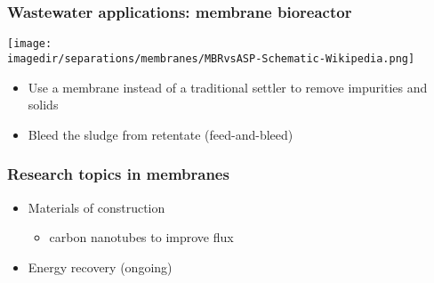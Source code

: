 \begin{frame}\frametitle{Wastewater applications: membrane bioreactor}
	

	
	\begin{center}
		\texttt{[image: \\imagedir/separations/membranes/MBRvsASP-Schematic-Wikipedia.png]}
	\end{center}
	
	\begin{itemize}
		\item	Use a membrane instead of a traditional settler to remove impurities and solids
		\item	Bleed the sludge from retentate (feed-and-bleed)
	\end{itemize}
\end{frame}

\begin{frame}\frametitle{Research topics in membranes}
	\begin{itemize}
		\item	Materials of construction
		\begin{itemize}
			\item	carbon nanotubes to improve flux %
		\end{itemize}
		
		\item	Energy recovery (ongoing)
	\end{itemize}
\end{frame}

